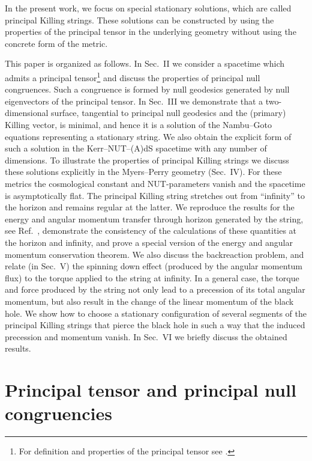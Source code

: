\documentclass[superscriptaddress,twocolumn,showpacs,
preprintnumbers,amsmath,amssymb,nofootinbib,
longbibliography,aps,prd,10pt]{revtex4-1}
\begin{document}
In the present work, we focus on special stationary solutions, which are called principal Killing strings. These solutions can be constructed by using the properties of the principal tensor in the underlying geometry without using the concrete form of the metric.

This paper is organized as follows. In Sec.~II we consider a spacetime which admits a principal tensor\footnote{For definition and properties of the principal tensor see \cite{Frolov:2017kze}.} and discuss the properties of principal null congruences. Such a congruence is formed by null geodesics generated by null eigenvectors of the principal tensor. In Sec.~III we demonstrate that a two-dimensional surface, tangential to principal null geodesics and the (primary) Killing vector, is minimal, and hence it is a solution of the Nambu--Goto equations representing a stationary string. We also obtain the explicit form of such a solution in the Kerr--NUT--(A)dS spacetime with any number of dimensions. To illustrate the properties of principal Killing strings we discuss these solutions explicitly in the Myers--Perry geometry (Sec.~IV). For these metrics the cosmological constant and NUT-parameters vanish and the spacetime is asymptotically flat. The principal Killing string stretches out from ``infinity'' to the horizon and remains regular at the latter. We reproduce the results for the energy and angular momentum transfer through horizon generated by the string, see Ref.~\cite{Frolov:2004qw}, demonstrate the consistency of the calculations of these quantities at the horizon and infinity, and prove a special version of the energy and angular momentum conservation theorem. We also discuss the backreaction problem, and relate (in Sec.~V) the spinning down effect (produced by the angular momentum flux) to the torque applied to the string at infinity. In a general case, the torque and force produced by the string not only lead to a precession of its total angular momentum, but also result in the change of the linear momentum of the black hole. We show how to choose a stationary configuration of several segments of the principal Killing strings that pierce the black hole in such a way that the induced precession and momentum vanish. In Sec.~VI we briefly discuss the obtained results.

\section{Principal tensor and principal null congruencies}
\end{document}
